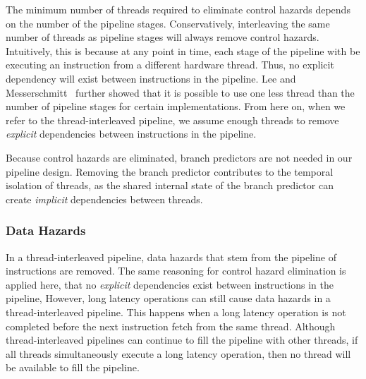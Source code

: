 The minimum number of threads required to eliminate control hazards depends on the number of the pipeline stages.
Conservatively, interleaving the same number of threads as pipeline stages will always remove control hazards.
Intuitively, this is because at any point in time, each stage of the pipeline with be executing an instruction from a different hardware thread. 
Thus, no explicit dependency will exist between instructions in the pipeline. 
Lee and Messerschmitt~\cite{lee1987pip} further showed that it is possible to use one less thread than the number of pipeline stages for certain implementations. 
From here on, when we refer to the thread-interleaved pipeline, we assume enough threads to remove \emph{explicit} dependencies between instructions in the pipeline.
	
Because control hazards are eliminated, branch predictors are not needed in our pipeline design. 
Removing the branch predictor contributes to the temporal isolation of threads, as the shared internal state of the branch predictor can create \emph{implicit} dependencies between threads.  

\subsubsection{Data Hazards}
In a thread-interleaved pipeline, data hazards that stem from the pipeline of instructions are removed.  
The same reasoning for control hazard elimination is applied here, that no \emph{explicit} dependencies exist between instructions in the pipeline, 
However, long latency operations can still cause data hazards in a thread-interleaved pipeline. 
This happens when a long latency operation is not completed before the next instruction fetch from the same thread.
Although thread-interleaved pipelines can continue to fill the pipeline with other threads, if all threads simultaneously execute a long latency operation, then no thread will be available to fill the pipeline. 

